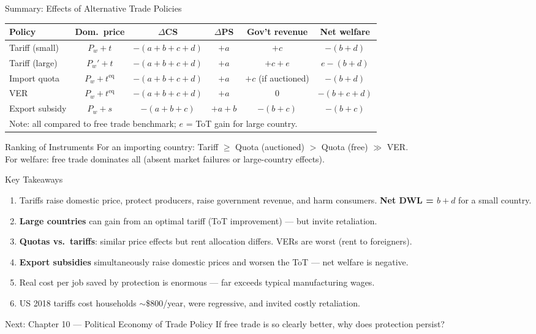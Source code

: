 \documentclass[aspectratio=169]{beamer}
\begin{document}
\begin{frame}{Summary: Effects of Alternative Trade Policies}
\begin{center}
\begin{adjustbox}{max width=0.95\textwidth,max totalheight=0.75\textheight}
\begin{tabular}{lccccc}
\toprule
\textbf{Policy} & \textbf{Dom.\ price} & \textbf{$\Delta$CS} & \textbf{$\Delta$PS} & \textbf{Gov't revenue} & \textbf{Net welfare}\\
\midrule
Tariff (small) & $P_w + t$ & $-(a+b+c+d)$ & $+a$ & $+c$ & $-(b+d)$\\
Tariff (large) & $P_w' + t$ & $-(a+b+c+d)$ & $+a$ & $+c+e$ & $e-(b+d)$\\
Import quota & $P_w + t^{\text{eq}}$ & $-(a+b+c+d)$ & $+a$ & $+c$ (if auctioned) & $-(b+d)$\\
VER & $P_w + t^{\text{eq}}$ & $-(a+b+c+d)$ & $+a$ & $0$ & $-(b+c+d)$\\
Export subsidy & $P_w + s$ & $-(a+b+c)$ & $+a+b$ & $-(b+c)$ & $-(b+c)$\\
\bottomrule
\multicolumn{6}{l}{\small Note: all compared to free trade benchmark; $e$ = ToT gain for large country.}
\end{tabular}
\end{adjustbox}
\end{center}
\vspace{0.2em}
\begin{insight}{Ranking of Instruments}
  For an importing country: Tariff $\geq$ Quota (auctioned) $>$ Quota (free) $\gg$ VER.\\
  For welfare: free trade dominates all (absent market failures or large-country effects).
\end{insight}
\end{frame}

\begin{frame}{Key Takeaways}
\begin{enumerate}
  \item Tariffs raise domestic price, protect producers, raise government revenue, and harm consumers. \textbf{Net DWL = $b + d$} for a small country.
  \item \textbf{Large countries} can gain from an optimal tariff (ToT improvement) --- but invite retaliation.
  \item \textbf{Quotas vs.\ tariffs}: similar price effects but rent allocation differs. VERs are worst (rent to foreigners).
  \item \textbf{Export subsidies} simultaneously raise domestic prices and worsen the ToT --- net welfare is negative.
  \item Real cost per job saved by protection is enormous --- far exceeds typical manufacturing wages.
  \item US 2018 tariffs cost households $\sim$\$800/year, were regressive, and invited costly retaliation.
\end{enumerate}
\begin{block}{Next: Chapter 10 --- Political Economy of Trade Policy}
  If free trade is so clearly better, why does protection persist?
\end{block}
\end{frame}
\end{document}

